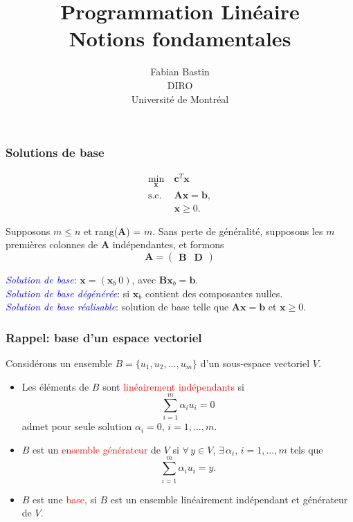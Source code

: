 \documentclass[usepdftitle=false]{beamer}
\title[Notions fondamentales]{Programmation Linéaire\\Notions fondamentales}
\author[Fabian Bastin]{Fabian Bastin\\DIRO\\Université de Montréal}
\date{}
\def\bb{\boldsymbol{b}}
\def\bc{\boldsymbol{c}}
\def\bx{\boldsymbol{x}}
\def\bA{\boldsymbol{A}}
\def\bB{\boldsymbol{B}}
\def\bD{\boldsymbol{D}}
\begin{document}
\frame{\titlepage}

\begin{frame}
\frametitle{Solutions de base}

\begin{align*}
\min_{\bx}\ & \bc^T \bx \\
\mbox{s.c. } & \bA \bx = \bb, \\
 & \bx \geq 0.
\end{align*}

\mbox{}

Supposons $m \leq n$ et rang($\bA$) = $m$.
Sans perte de généralité, supposons les $m$ premières colonnes de $\bA$ indépendantes, et formons
\[
\bA =
\begin{pmatrix}
 \bB & \bD
\end{pmatrix}
\]

\mbox{}

{\it \textcolor{blue}{Solution de base}}: $\bx = (\bx_b \ 0)$, avec $\bB\bx_b = \bb$.\\
{\it \textcolor{blue}{Solution de base dégénérée}}: si $\bx_b$ contient des composantes nulles. \\
{\it \textcolor{blue}{Solution de base réalisable}}: solution de base telle que $\bA\bx = \bb$ et $\bx \geq 0$.
\end{frame}

\begin{frame}
\frametitle{Rappel: base d'un espace vectoriel}

Considérons un ensemble $B = \lbrace u_1, u_2,\ldots, u_m \rbrace$ d'un sous-espace vectoriel $V$.

\begin{itemize}
\item 
Les éléments de $B$ sont \textcolor{red}{linéairement indépendants} si
$$
\sum_{i=1}^m \alpha_i u_i = 0
$$
admet pour seule solution $\alpha_i = 0$, $i = 1,\ldots,m$.
\item
$B$ est un \textcolor{red}{ensemble générateur} de $V$ si $\forall\, y \in V$, $\exists\, \alpha_i$, $i = 1,\ldots,m$ tels que
$$
\sum_{i=1}^m \alpha_i u_i = y.
$$
\item
$B$ est une \textcolor{red}{base}, si $B$ est un ensemble linéairement indépendant et générateur
de $V$.
\end{itemize}

\end{frame}
\end{document}
